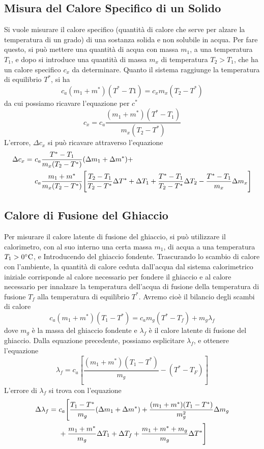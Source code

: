 \documentclass[a4paper]{article}
\begin{document}
\subsection{Misura del Calore Specifico di un Solido}
Si vuole misurare il calore specifico (quantità di calore che serve per alzare la temperatura di un grado) di una sostanza solida e non solubile in acqua. Per fare questo, si può mettere una quantità di acqua con massa $m_1$, a una temperatura $T_1$, e dopo si introduce una quantità di massa $m_x$ di temperatura $T_2 > T_1$, che ha un calore specifico $c_x$ da determinare. Quanto il sistema raggiunge la temperatura di equilibrio $T^*$, si ha 
\begin{equation}
    c_a(m_1+m^*)(T^*-T1) = c_xm_x(T_2-T^*)
\end{equation}
da cui possiamo ricavare l'equazione per $c^*$
\begin{equation}
    c_x = c_a \frac{(m_1+m^*)(T^*-T_1)}{m_x(T_2-T^*)}
\end{equation}
L'errore, $\Delta c_x$ si può ricavare attraverso l'equazione 
\begin{align}
\Delta c_x =\ & c_a \frac{T^* - T_1}{m_x (T_2 - T^*)} (\Delta m_1 + \Delta m^*) + \\
&
c_a \frac{m_1 + m^*}{m_x (T_2 - T^*)} \Bigg[ \frac{T_2 - T_1}{T_2 - T^*} \Delta T^* 
+ \Delta T_1 \notag + \frac{T^* - T_1}{T_2 - T^*} \Delta T_2 
- \frac{T^* - T_1}{m_x} \Delta m_x \Bigg]
\end{align}

\subsection{Calore di Fusione del Ghiaccio}
Per misurare il calore latente di fusione del ghiaccio, si può utilizzare il calorimetro, con al suo interno una certa massa $m_1$, di acqua a una temperatura $T_1 > 0\degree \SI{}{C}$, e Introducendo del ghiaccio fondente.  Trascurando lo scambio di calore con l'ambiente, la quantità di calore ceduta dall'acqua dal sistema calorimetrico iniziale corrisponde al calore necessario per fondere il ghiaccio e al calore necessario per innalzare la temperatura dell'acqua di fusione della temperatura di fusione $T_f$ alla temperatura di equilibrio $T^*$. Avremo cioè il bilancio degli scambi di calore 
\begin{equation}
    c_a(m_1+m^*)(T_1-T^*)=c_am_g(T^*-T_f)+m_g \lambda_f
\end{equation}
dove $m_g$ è la massa del ghiaccio fondente e $\lambda_f$ è il calore latente di fusione del ghiaccio. Dalla equazione precedente, possiamo esplicitare $\lambda_f$, e ottenere l'equazione
\begin{equation}
    \lambda_f = c_a[\frac{(m_1+m^*)(T_1-T^*)}{m_g} - (T^*-T_F)]
\end{equation}
L'errore di $\lambda_f$ si trova con l'equazione
\begin{align}
\Delta \lambda_f =\ & c_a \Bigg[ \frac{T_1 - T^*}{m_g} (\Delta m_1 + \Delta m^*) 
+ \frac{(m_1 + m^*)(T_1 - T^*)}{m_g^2} \Delta m_g \notag \\
& + \frac{m_1 + m^*}{m_g} \Delta T_1 + \Delta T_f 
+ \frac{m_1 + m^* + m_g}{m_g} \Delta T^* \Bigg]
\end{align}
\end{document}
